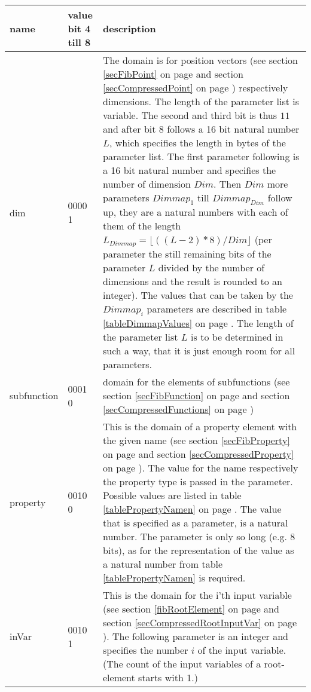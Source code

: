 \begin{center}
\begin{longtable}{|p{25mm}|p{15mm}|p{85mm}|}\hline
	name & value bit 4 till 8 & description \\\hline\endhead
	dim & 0000 1 & The domain is for position vectors (see section \ref{secFibPoint} on page \pageref{secFibPoint} and section \ref{secCompressedPoint} on page \pageref{secCompressedPoint}) respectively dimensions. The length of the parameter list is variable. The second and third bit is thus $11$ and after bit 8 follows a 16 bit natural number $L$, which specifies the length in bytes of the parameter list. The first parameter following is a 16 bit natural number and specifies the number of dimension $Dim$. Then $Dim$ more parameters $Dimmap_1$ till $Dimmap_{Dim}$ follow up, they are a natural numbers with each of them of the length $L_{Dimmap}=\lfloor((L-2) * 8)/Dim\rfloor$ (per parameter the still remaining bits of the parameter $L$ divided by the number of dimensions and the result is rounded to an integer). The values that can be taken by the $Dimmap_i$ parameters are described in table \ref{tableDimmapValues} on page \pageref{tableDimmapValues}. The length of the parameter list $L$ is to be determined in such a way, that it is just enough room for all parameters.\\\hline
	subfunction & 0001 0 & domain for the elements of subfunctions (see section \ref{secFibFunction} on page \pageref{secFibFunction} and section \ref{secCompressedFunctions} on page \pageref{secCompressedFunctions})\\\hline
	property & 0010 0 & This is the domain of a property element with the given name (see section \ref{secFibProperty} on page \pageref{secFibProperty} and section \ref{secCompressedProperty} on page \pageref{secCompressedProperty}). The value for the name respectively the property type is passed in the parameter. Possible values are listed in table \ref{tablePropertyNamen} on page \pageref{tablePropertyNamen}. The value that is specified as a parameter, is a natural number. The parameter is only so long (e.g. 8 bits), as for the representation of the value as a natural number from table \ref{tablePropertyNamen} is required.\\\hline
	inVar & 0010 1 & This is the domain for the i'th input variable (see section \ref{fibRootElement} on page \pageref{fibRootElement} and section \ref{secCompressedRootInputVar} on page \pageref{secCompressedRootInputVar}). The following parameter is an integer and specifies the number $i$ of the input variable. (The count of the input variables of a root-element starts with 1.) \\\hline


\end{longtable}
\end{center}
